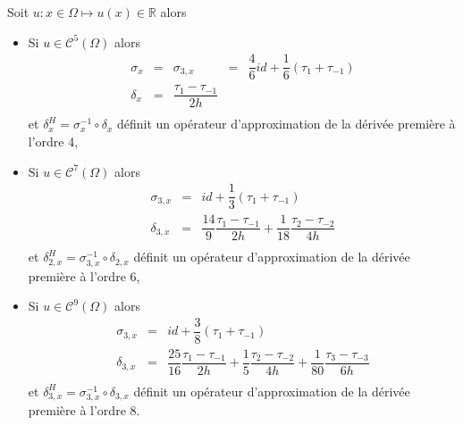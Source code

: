 \begin{corollaire}
Soit $u : x \in \Omega \mapsto u(x) \in \mathbb{R}$ alors 
\begin{itemize}
\item Si $u \in \mathcal{C}^{5}(\Omega)$ alors 
\begin{equation}
\begin{array}{rcccl}
\sigma_{x} &=& \sigma_{3,x} &=& \dfrac{4}{6} id + \dfrac{1}{6} \left( \tau_1 + \tau_{-1} \right)\\
\delta_{x} &=& \dfrac{\tau_1 - \tau_{-1}}{2h} &&\\ 
\end{array}
\label{eq:comp4}
\end{equation}
et $\delta^H_x = \sigma_x^{-1} \circ \delta_x$ définit un opérateur d'approximation de la dérivée première à l'ordre 4,

\item Si $u \in \mathcal{C}^{7}(\Omega)$ alors 
\begin{equation}
\begin{array}{rcl}
\sigma_{3,x} &=& id + \dfrac{1}{3}\left( \tau_1 + \tau_{-1} \right) \\
\delta_{3,x} &=& \dfrac{14}{9} \dfrac{\tau_1 - \tau_{-1}}{2h} + \dfrac{1}{18} \dfrac{\tau_2 - \tau_{-2}}{4h}\\ 
\end{array}
\label{eq:comp6}
\end{equation}
et $\delta^H_{2,x} = \sigma_{3,x}^{-1} \circ \delta_{2,x}$ définit un opérateur d'approximation de la dérivée première à l'ordre 6,


\item Si $u \in \mathcal{C}^{9}(\Omega)$ alors 
\begin{equation}
\begin{array}{rcl}
\sigma_{3,x} &=& id + \dfrac{3}{8}\left( \tau_1 + \tau_{-1} \right) \\
\delta_{3,x} &=& \dfrac{25}{16} \dfrac{\tau_1 - \tau_{-1}}{2h} + \dfrac{1}{5} \dfrac{\tau_2 - \tau_{-2}}{4h} + \dfrac{1}{80} \dfrac{\tau_3 - \tau_{-3}}{6h} \\ 
\end{array}
\label{eq:comp8}
\end{equation}
et $\delta^H_{3,x} = \sigma_{3,x}^{-1} \circ \delta_{3,x}$ définit un opérateur d'approximation de la dérivée première à l'ordre 8.

\end{itemize}
\end{corollaire}

